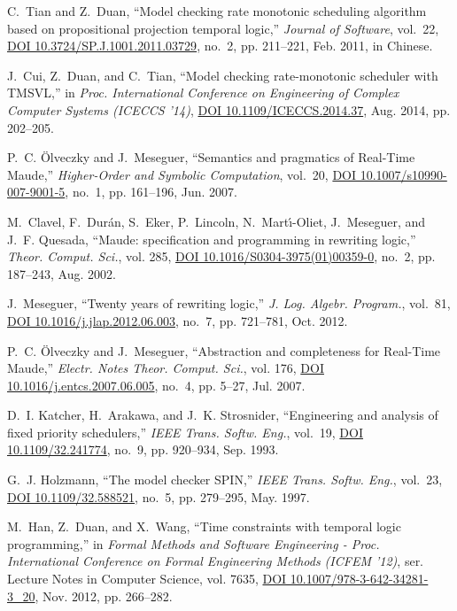 \documentclass[12pt,onecolumn]{IEEEtranTIE}
\begin{document}
\begin{thebibliography}{10}
C.~Tian and Z.~Duan, ``Model checking rate monotonic scheduling algorithm based
  on propositional projection temporal logic,'' \emph{Journal of Software},
  vol.~22, \href{http://dx.doi.org/10.3724/SP.J.1001.2011.03729}{DOI
  10.3724/SP.J.1001.2011.03729}, no.~2, pp. 211--221, Feb. 2011, in {Chinese}.

J.~Cui, Z.~Duan, and C.~Tian, ``Model checking rate-monotonic scheduler with
  {TMSVL},'' in \emph{Proc. International Conference on Engineering of Complex
  Computer Systems ({ICECCS} '14)},
  \href{http://dx.doi.org/10.1109/ICECCS.2014.37}{DOI 10.1109/ICECCS.2014.37},
  Aug. 2014, pp. 202--205.

P.~C. {\"{O}}lveczky and J.~Meseguer, ``Semantics and pragmatics of {Real-Time
  Maude},'' \emph{Higher-Order and Symbolic Computation}, vol.~20,
  \href{http://dx.doi.org/10.1007/s10990-007-9001-5}{DOI
  10.1007/s10990-007-9001-5}, no.~1, pp. 161--196, Jun. 2007.

M.~Clavel, F.~Dur{\'{a}}n, S.~Eker, P.~Lincoln, N.~Mart{\'{\i}}{-}Oliet,
  J.~Meseguer, and J.~F. Quesada, ``Maude: specification and programming in
  rewriting logic,'' \emph{Theor. Comput. Sci.}, vol. 285,
  \href{http://dx.doi.org/10.1016/S0304-3975(01)00359-0}{DOI
  10.1016/S0304-3975(01)00359-0}, no.~2, pp. 187--243, Aug. 2002.

J.~Meseguer, ``Twenty years of rewriting logic,'' \emph{J. Log. Algebr.
  Program.}, vol.~81, \href{http://dx.doi.org/10.1016/j.jlap.2012.06.003}{DOI
  10.1016/j.jlap.2012.06.003}, no.~7, pp. 721--781, Oct. 2012.

P.~C. {\"{O}}lveczky and J.~Meseguer, ``Abstraction and completeness for
  {Real-Time Maude},'' \emph{Electr. Notes Theor. Comput. Sci.}, vol. 176,
  \href{http://dx.doi.org/10.1016/j.entcs.2007.06.005}{DOI
  10.1016/j.entcs.2007.06.005}, no.~4, pp. 5--27, Jul. 2007.

D.~I. Katcher, H.~Arakawa, and J.~K. Strosnider, ``Engineering and analysis of
  fixed priority schedulers,'' \emph{{IEEE} Trans. Softw. Eng.}, vol.~19,
  \href{http://dx.doi.org/10.1109/32.241774}{DOI 10.1109/32.241774}, no.~9, pp.
  920--934, Sep. 1993.

G.~J. Holzmann, ``The model checker {SPIN},'' \emph{{IEEE} Trans. Softw. Eng.},
  vol.~23, \href{http://dx.doi.org/10.1109/32.588521}{DOI 10.1109/32.588521},
  no.~5, pp. 279--295, May. 1997.

M.~Han, Z.~Duan, and X.~Wang, ``Time constraints with temporal logic
  programming,'' in \emph{Formal Methods and Software Engineering - Proc.
  International Conference on Formal Engineering Methods ({ICFEM} '12)}, ser.
  Lecture Notes in Computer Science, vol. 7635,
  \href{http://dx.doi.org/10.1007/978-3-642-34281-3\_20}{DOI
  10.1007/978-3-642-34281-3\_20}, Nov. 2012, pp. 266--282.

\end{thebibliography}\
\end{document}

